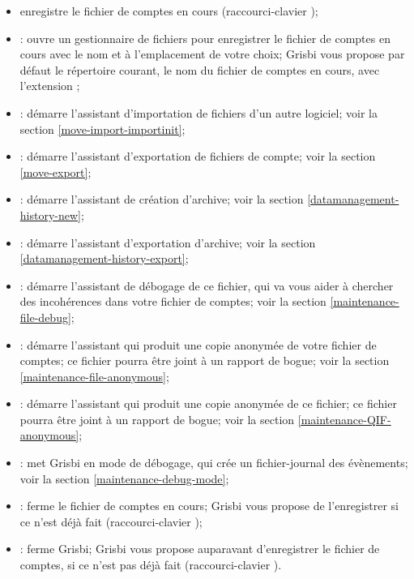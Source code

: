 \begin{itemize}[resume]
	\item {} enregistre le fichier de comptes en cours (raccourci-clavier );
	\item {}: ouvre un gestionnaire de fichiers pour enregistrer le fichier de comptes en cours avec le nom et à l'emplacement de 	votre choix; Grisbi vous propose par défaut le répertoire courant, le nom du fichier de comptes en cours, avec l'extension ;
	\item {}: démarre l'assistant d'importation de fichiers d'un autre logiciel; voir la section \vref{move-import-importinit};
	\item {}: démarre l'assistant d'exportation de fichiers de compte; voir la section \vref{move-export};	
	\item {}: démarre l'assistant de création d'archive; voir la section \vref{datamanagement-history-new};	
	\item {}: démarre l'assistant d'exportation d'archive; voir la section \vref{datamanagement-history-export};
	\item {}: démarre l'assistant de 	débogage de ce fichier, qui va vous aider à chercher des incohérences dans votre fichier de comptes; voir la section \vref{maintenance-file-debug};
	\item {}: démarre l'assistant qui produit une copie anonymée de votre fichier de comptes; ce fichier pourra être joint à un rapport de bogue; voir la section \vref{maintenance-file-anonymous};	
	\item {}: démarre l'assistant qui produit une copie anonymée de ce fichier; ce fichier pourra être joint à un rapport de bogue; voir la section \vref{maintenance-QIF-anonymous};	
	\item {}: met Grisbi en mode de débogage, qui crée un fichier-journal des évènements; voir la section \vref{maintenance-debug-mode}; 	
	\item {}: ferme le fichier de comptes en cours; Grisbi vous propose de l'enregistrer si ce n'est déjà fait (raccourci-clavier );
	\item {}: ferme Grisbi; Grisbi vous propose auparavant d'enregistrer le fichier de comptes, si ce n'est pas déjà fait (raccourci-clavier ).
\end{itemize}


